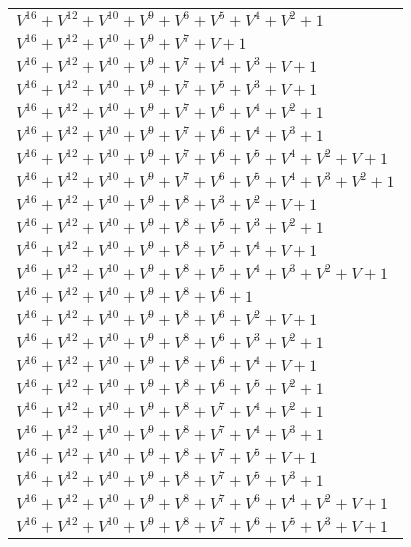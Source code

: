 \documentclass[12pt]{article}
\begin{document}
\begin{adjustwidth}{-4cm}{}
\begin{center}
\begin{longtable}{|l|}
$V^{16}  +V^{12}  +V^{10}  +V^{9}  +V^{6}  +V^{5}  +V^{4}  +V^{2}  + 1$ \\
$V^{16}  +V^{12}  +V^{10}  +V^{9}  +V^{7}  + V + 1$ \\
$V^{16}  +V^{12}  +V^{10}  +V^{9}  +V^{7}  +V^{4}  +V^{3}  + V + 1$ \\
$V^{16}  +V^{12}  +V^{10}  +V^{9}  +V^{7}  +V^{5}  +V^{3}  + V + 1$ \\
$V^{16}  +V^{12}  +V^{10}  +V^{9}  +V^{7}  +V^{6}  +V^{4}  +V^{2}  + 1$ \\
$V^{16}  +V^{12}  +V^{10}  +V^{9}  +V^{7}  +V^{6}  +V^{4}  +V^{3}  + 1$ \\
$V^{16}  +V^{12}  +V^{10}  +V^{9}  +V^{7}  +V^{6}  +V^{5}  +V^{4}  +V^{2}  + V + 1$ \\
$V^{16}  +V^{12}  +V^{10}  +V^{9}  +V^{7}  +V^{6}  +V^{5}  +V^{4}  +V^{3}  +V^{2}  + 1$ \\
$V^{16}  +V^{12}  +V^{10}  +V^{9}  +V^{8}  +V^{3}  +V^{2}  + V + 1$ \\
$V^{16}  +V^{12}  +V^{10}  +V^{9}  +V^{8}  +V^{5}  +V^{3}  +V^{2}  + 1$ \\
$V^{16}  +V^{12}  +V^{10}  +V^{9}  +V^{8}  +V^{5}  +V^{4}  + V + 1$ \\
$V^{16}  +V^{12}  +V^{10}  +V^{9}  +V^{8}  +V^{5}  +V^{4}  +V^{3}  +V^{2}  + V + 1$ \\
$V^{16}  +V^{12}  +V^{10}  +V^{9}  +V^{8}  +V^{6}  + 1$ \\
$V^{16}  +V^{12}  +V^{10}  +V^{9}  +V^{8}  +V^{6}  +V^{2}  + V + 1$ \\
$V^{16}  +V^{12}  +V^{10}  +V^{9}  +V^{8}  +V^{6}  +V^{3}  +V^{2}  + 1$ \\
$V^{16}  +V^{12}  +V^{10}  +V^{9}  +V^{8}  +V^{6}  +V^{4}  + V + 1$ \\
$V^{16}  +V^{12}  +V^{10}  +V^{9}  +V^{8}  +V^{6}  +V^{5}  +V^{2}  + 1$ \\
$V^{16}  +V^{12}  +V^{10}  +V^{9}  +V^{8}  +V^{7}  +V^{4}  +V^{2}  + 1$ \\
$V^{16}  +V^{12}  +V^{10}  +V^{9}  +V^{8}  +V^{7}  +V^{4}  +V^{3}  + 1$ \\
$V^{16}  +V^{12}  +V^{10}  +V^{9}  +V^{8}  +V^{7}  +V^{5}  + V + 1$ \\
$V^{16}  +V^{12}  +V^{10}  +V^{9}  +V^{8}  +V^{7}  +V^{5}  +V^{3}  + 1$ \\
$V^{16}  +V^{12}  +V^{10}  +V^{9}  +V^{8}  +V^{7}  +V^{6}  +V^{4}  +V^{2}  + V + 1$ \\
$V^{16}  +V^{12}  +V^{10}  +V^{9}  +V^{8}  +V^{7}  +V^{6}  +V^{5}  +V^{3}  + V + 1$ \\

\end{longtable}
\end{center}
\end{adjustwidth}
\end{document}
